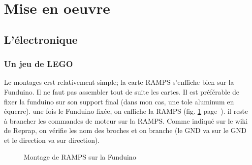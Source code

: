 \section{Mise en oeuvre}%
\subsection{L'électronique}%
\subsubsection{Un jeu de LEGO}
Le montages erst relativement simple; la carte RAMPS s'enffiche bien sur la Funduino. %
Il ne faut pas  assembler tout de suite les cartes. Il est préférable de fixer la %
funduino sur son support final (dans mon cas, une tole aluminum en équerre). une fois %
le Funduino fixée, on enffiche  la RAMPS (fig. \ref{montage_carte} %
page~\pageref{montage_carte}). il reste à brancher les commandes de moteur %
sur la RAMPS. Comme indiqué sur le wiki de Reprap, on vérifie les nom des broches et %
on branche (le GND va sur le GND et le direction va sur direction).%
\begin{figure}%
   \caption{\label{montage_carte} Montage de RAMPS sur la Funduino}%
\end{figure}%

